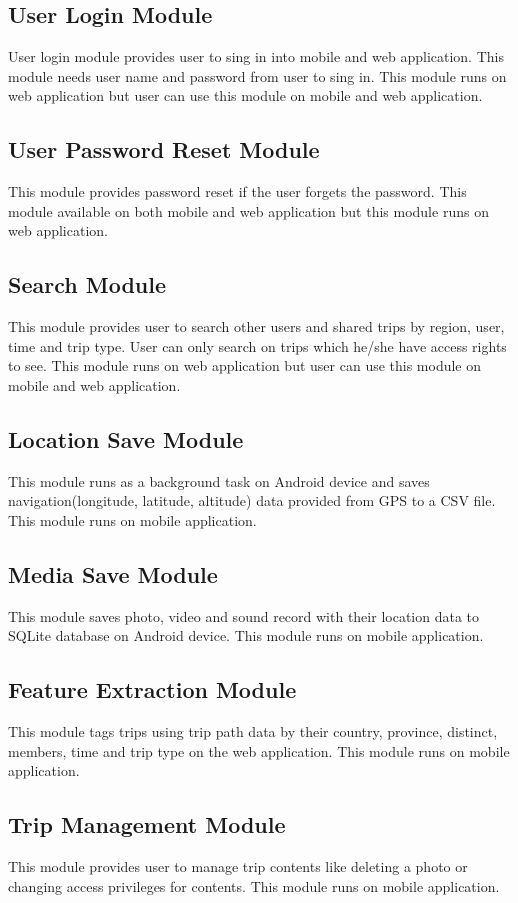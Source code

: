 \subsection{User Login Module}
User login module provides user to sing in into mobile and web application. This module needs user name and password from user to sing in. This module runs on web application but user can use this module on mobile and web application.
\subsection{User Password Reset Module}
This module provides password reset if the user forgets the password. This module available on both mobile and web application but this module runs on web application.
\subsection{Search Module}
This module provides user to search other users and shared trips by region, user, time and trip type. User can only search on trips which he/she have access rights to see. This module runs on web application but user can use this module on mobile and web application. 
\subsection{Location Save Module}
This module runs as a background task on Android device and saves navigation(longitude, latitude, altitude) data provided from GPS to a CSV file. This module runs on mobile application.
\subsection{Media Save Module}
This module saves photo, video and sound record with their location data to SQLite database on Android device. This module runs on mobile application.
\subsection{Feature Extraction Module}
This module tags trips using trip path data by their country, province, distinct, members, time and trip type on the web application. This module runs on mobile application.
\subsection{Trip Management Module}
This module provides user to manage trip contents like deleting a photo or changing access privileges for contents. This module runs on mobile application.
